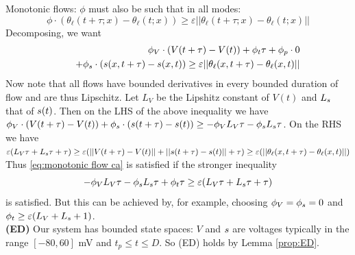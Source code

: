 \begin{prf}
Monotonic flows: $\phi$ must also be such that in all modes:
\begin{equation*}
\phi \cdot (\theta_\ell(t+\tau;x) - \theta_\ell(t;x)) \geq \varepsilon ||\theta_\ell(t+\tau;x) - \theta_\ell(t;x)||
\end{equation*}
Decomposing, we want 
\begin{eqnarray*}
\label{eq:monotonic flow ca}
&&\phi_V \cdot(V(t+\tau) - V(t)) + \phi_t \tau + \phi_p \cdot 0 \\
&&\quad+ \phi_s \cdot (s(x,t+\tau) - s(x,t)) \geq \varepsilon ||\theta_\ell(x,t+\tau) - \theta_\ell(x,t)||
\end{eqnarray*}
Now note that all flows have bounded derivatives in every bounded duration of flow and are thus Lipschitz. 
Let $L_V$ be the Lipshitz constant of $V(t)$ and $L_{s}$ that of $s(t)$.
Then on the LHS of the above inequality we have 
$\phi_V \cdot(V(t+\tau) - V(t)) + \phi_s \cdot(s(t+\tau) - s(t)) \geq -\phi_V L_V \tau  -\phi_s L_{s} \tau$.
On the RHS we have  
$\varepsilon (L_V\tau + L_{s}\tau + \tau) \geq \varepsilon ( ||V(t+\tau) - V(t)|| + ||s(t+\tau) - s(t) ||  + \tau) \geq \varepsilon ( ||\theta_\ell(x,t+\tau) - \theta_\ell(x,t)||)$
Thus \eqref{eq:monotonic flow ca} is satisfied if the stronger inequality 
\[-\phi_V L_V \tau  -\phi_s L_{s} \tau + \phi_t \tau \geq \varepsilon (L_V\tau + L_{s}\tau + \tau) \]
is satisfied.
But this can be achieved by, for example, choosing $\phi_V = \phi_s = 0$ and $\phi_t \geq \varepsilon(L_V+L_{s}+1)$.
\\
\textbf{(ED)} Our system has bounded state spaces: $V$ and $s$ are voltages typically in the range $[-80,60]$ mV and $t_p \leq t \leq D$.
So (ED) holds by Lemma \ref{prop:ED}. 
\end{prf}